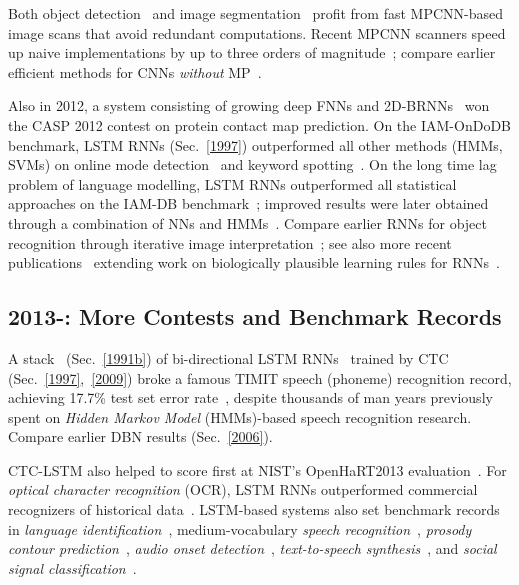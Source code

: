 \documentclass[letterpaper]{article}
\begin{document}
\begin{sloppypar}
Both object detection~\citep{miccai2013}  and image segmentation~\citep{ciresan2012nips}  
profit from fast MPCNN-based image scans that avoid redundant computations.
Recent MPCNN scanners  
speed up naive implementations  by up to 
three orders of magnitude~\citep{masci:2013icip,Giusti:2013a};
compare earlier efficient methods for CNNs {\em without} MP~\citep{vaillant-monrocq-lecun-94}.

Also in 2012,
a system consisting of  growing deep FNNs and 
2D-BRNNs~\citep{baldi2012contact} won the CASP 2012 contest
on protein contact map prediction.
On the IAM-OnDoDB benchmark,
LSTM RNNs (Sec.~\ref{1997}) outperformed all other methods (HMMs, SVMs) on 
online mode detection~\citep{otte2012local,indermuhle2012mode}
and keyword spotting~\citep{indermuhle2011keyword}.
On the long time lag problem of language modelling, LSTM RNNs 
outperformed all statistical approaches on the IAM-DB benchmark~\citep{frinken2012long};
improved results were later obtained through a combination of NNs and HMMs~\citep{zamora2014}.
Compare earlier RNNs for object 
recognition through iterative image interpretation~\citep{Behnke:IJCNN1998,Behnke:ICANN2002,Behnke:LNCS};
see also more recent publications~\citep{wyatte2012b,oreilly2013} extending
work on biologically plausible learning rules for RNNs~\citep{oreilly1996}.



\subsection{2013-: More Contests and Benchmark Records}
\label{2013}

A stack~\citep{Santi:07ijcai,graves:2009nips} (Sec.~\ref{1991b}) of bi-directional LSTM 
RNNs~\citep{graves05nn}  
trained by CTC (Sec.~\ref{1997},~\ref{2009}) 
broke a famous TIMIT speech (phoneme) recognition record, achieving 17.7\% test set error rate~\citep{graves:2013icassp}, despite thousands of man years previously spent on {\em Hidden Markov Model} (HMMs)-based speech recognition research. 
Compare earlier DBN results (Sec.~\ref{2006}).

CTC-LSTM also 
helped to score first at NIST's OpenHaRT2013 evaluation~\citep{bluche13}.
For {\em optical character recognition} (OCR), LSTM RNNs outperformed commercial 
recognizers of historical data~\citep{breuel2013high}.
LSTM-based systems  also set benchmark records in
{\em language identification}~\citep{gonzalez2014},
medium-vocabulary {\em speech recognition}~\citep{geiger2014},
{\em prosody contour prediction}~\citep{fernandez2014},
{\em audio onset detection}~\citep{marchi2014},
{\em text-to-speech synthesis}~\citep{fan2014}, and
{\em social signal classification}~\citep{brueckner2014}.


\end{sloppypar}
\end{document}
